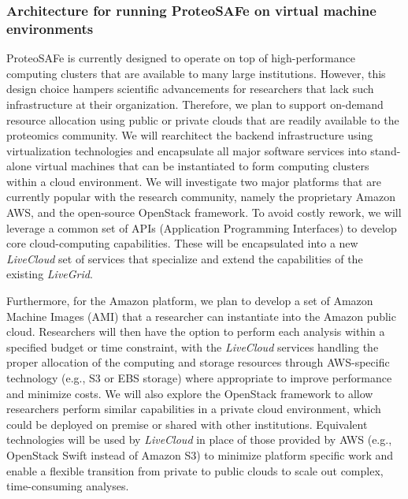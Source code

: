 \documentclass[arial,11pt]{article}
\newcommand{\SF}[1]{\textsf{#1}}
\newcommand{\SYSTEM}[0]{\SF{ProteoSAFe}\xspace}
\begin{document}
\subsubsection{Architecture for running ProteoSAFe on virtual machine environments}
\SYSTEM is currently designed to operate on top of high-performance computing clusters that are available to many large institutions. However, this design choice hampers scientific advancements for researchers that lack such infrastructure at their organization. Therefore, we plan to support on-demand resource allocation using public or private clouds that are readily available to the proteomics community. We will rearchitect the backend infrastructure using virtualization technologies and encapsulate all major software services into stand-alone virtual machines that can be instantiated to form computing clusters within a cloud environment. We will investigate two major platforms that are currently popular with the research community, namely the proprietary Amazon AWS, and the open-source OpenStack framework. To avoid costly rework, we will leverage a common set of APIs (Application Programming Interfaces) to develop core cloud-computing capabilities. These will be encapsulated into a new {\em LiveCloud} set of services that specialize and extend the capabilities of the existing \emph{LiveGrid}.


Furthermore, for the Amazon platform, we plan to develop a set of Amazon Machine Images (AMI) that a researcher can instantiate into the Amazon public cloud. Researchers will then have the option to perform each analysis within a specified budget or time constraint, with the \emph{LiveCloud} services handling the proper allocation of the computing and storage resources through AWS-specific technology (e.g., S3 or EBS storage) where appropriate to improve performance and minimize costs.
We will also explore the OpenStack framework to allow researchers perform similar capabilities in a private cloud environment, which could be deployed on premise or shared with other institutions. Equivalent technologies will be used by \emph{LiveCloud} in place of those provided by AWS (e.g., OpenStack Swift instead of Amazon S3) to minimize platform specific work and enable a flexible transition from private to public clouds to scale out complex, time-consuming analyses.
\end{document}
